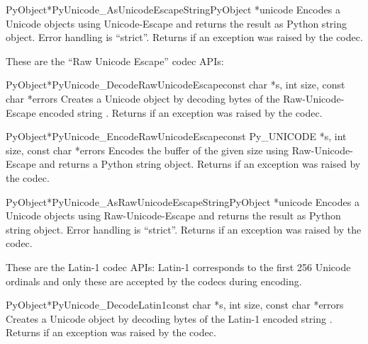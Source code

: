 \begin{cfuncdesc}{PyObject*}{PyUnicode_AsUnicodeEscapeString}{PyObject *unicode}
  Encodes a Unicode objects using Unicode-Escape and returns the
  result as Python string object.  Error handling is ``strict''.
  Returns \NULL{} if an exception was raised by the codec.
\end{cfuncdesc}


These are the ``Raw Unicode Escape'' codec APIs:

\begin{cfuncdesc}{PyObject*}{PyUnicode_DecodeRawUnicodeEscape}{const char *s,
                                               int size,
                                               const char *errors}
  Creates a Unicode object by decoding  bytes of the
  Raw-Unicode-Escape encoded string .  Returns \NULL{} if an
  exception was raised by the codec.
\end{cfuncdesc}

\begin{cfuncdesc}{PyObject*}{PyUnicode_EncodeRawUnicodeEscape}{const Py_UNICODE *s,
                                               int size,
                                               const char *errors}
  Encodes the  buffer of the given size using
  Raw-Unicode-Escape and returns a Python string object.  Returns
  \NULL{} if an exception was raised by the codec.
\end{cfuncdesc}

\begin{cfuncdesc}{PyObject*}{PyUnicode_AsRawUnicodeEscapeString}{PyObject *unicode}
  Encodes a Unicode objects using Raw-Unicode-Escape and returns the
  result as Python string object. Error handling is ``strict''.
  Returns \NULL{} if an exception was raised by the codec.
\end{cfuncdesc}


These are the Latin-1 codec APIs:
Latin-1 corresponds to the first 256 Unicode ordinals and only these
are accepted by the codecs during encoding.

\begin{cfuncdesc}{PyObject*}{PyUnicode_DecodeLatin1}{const char *s,
                                                     int size,
                                                     const char *errors}
  Creates a Unicode object by decoding  bytes of the Latin-1
  encoded string .  Returns \NULL{} if an exception was raised
  by the codec.
\end{cfuncdesc}


